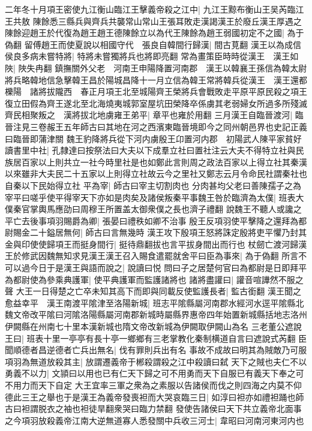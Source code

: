 二年冬十月項王密使九江衡山臨江王擊義帝殺之江中|{
	九江王黥布衡山王吴芮臨江王共敖}
陳餘悉三縣兵與齊兵共襲常山常山王張耳敗走漢謁漢王於廢丘漢王厚遇之陳餘迎趙王於代復為趙王趙王德陳餘立以為代王陳餘為趙王弱國初定不之國|{
	為于偽翻}
留傅趙王而使夏說以相國守代　張良自韓間行歸漢|{
	間古莧翻}
漢王以為成信侯良多病未嘗特將|{
	特將未嘗獨將兵也將即亮翻}
常為畫策臣時時從漢王　漢王如陜|{
	陜失冉翻}
鎮撫關外父老　河南王申陽降置河南郡　漢王以韓襄王孫信為韓太尉將兵略韓地信急擊韓王昌於陽城昌降十一月立信為韓王常將韓兵從漢王　漢王還都櫟陽　諸將拔隴西　春正月項王北至城陽齊王榮將兵會戰敗走平原平原民殺之項王復立田假為齊王遂北至北海燒夷城郭室屋坑田榮降卒係虜其老弱婦女所過多所殘滅齊民相聚叛之　漢將拔北地虜雍王弟平|{
	章平也雍於用翻}
三月漢王自臨晉渡河|{
	臨晉注見三卷赧王五年師古曰其地在河之西濱東臨晉境即今之同州朝邑界也史記正義曰臨晉即蒲津關}
魏王豹降將兵從下河内虜殷王卬置河内郡　初陽武人陳平家貧好讀書里中社|{
	孔隸達曰按祭法曰大夫以下成羣立社曰置社注云大夫不得特立社與民族居百家以上則共立一社今時里社是也如鄭此言則周之政法百家以上得立社其秦漢以來雖非大夫民二十五家以上則得立社故云今之里社又鄭志云月令命民社謂秦社也自秦以下民始得立社}
平為宰|{
	師古曰宰主切割肉也}
分肉甚均父老曰善陳孺子之為宰平曰嗟乎使平得宰天下亦如是肉矣及諸侯叛秦平事魏王咎於臨濟為太僕|{
	班表大僕秦官掌輿馬應劭曰周穆王所置盖太御衆僕之長也濟子禮翻}
說魏王不聽人或讒之平亡去後事項羽賜爵為卿|{
	張晏曰禮秩如卿不治事}
殷王反項羽使平擊降之還拜為都尉賜金二十鎰居無何|{
	師古曰言無幾時}
漢王攻下殷項王怒將誅定殷將吏平懼乃封其金與印使使歸項王而挺身間行|{
	挺待鼎翻拔也言平拔身間出而行也}
杖劒亡渡河歸漢王於修武因魏無知求見漢王漢王召入賜食遣罷就舍平曰臣為事來|{
	為于偽翻}
所言不可以過今日于是漢王與語而說之|{
	說讀曰悦}
問曰子之居楚何官曰為都尉是日即拜平為都尉使為參乘典護軍|{
	使平典護軍而監護諸將也}
諸將盡讙曰|{
	讙音喧譁然不服之聲}
大王一日得楚之亡卒未知其高下而即與同載反使監護長者|{
	監古銜翻}
漢王聞之愈益幸平　漢王南渡平隂津至洛陽新城|{
	班志平隂縣屬河南郡水經河水逕平隂縣北魏文帝改平隂曰河隂洛陽縣屬河南郡新城時屬縣界惠帝四年始置新城縣括地志洛州伊闕縣在州南七十里本漢新城也隋文帝改新城為伊闕取伊闕山為名}
三老董公遮說王曰|{
	班表十里一亭亭有長十亭一鄉鄉有三老掌教化秦制横道自言曰遮說式芮翻}
臣聞順德者昌逆德者亡兵出無名|{
	伐有罪則兵出有名}
事故不成故曰明其為賊敵乃可服項羽為無道放殺其主|{
	放謂遷義帝于郴殺謂殺之江中殺讀曰弑}
天下之賊也夫仁不以勇義不以力|{
	文頴曰以用也已有仁天下歸之可不用勇而天下自服已有義天下奉之可不用力而天下自定}
大王宜率三軍之衆為之素服以告諸侯而伐之則四海之内莫不仰德此三王之舉也于是漢王為義帝發喪袒而大哭哀臨三日|{
	如淳曰袒亦如禮袒踊也師古曰袒謂脱衣之袖也袒徒旱翻衆哭曰臨力禁翻}
發使告諸侯曰天下共立義帝北面事之今項羽放殺義帝江南大逆無道寡人悉發關中兵收三河士|{
	韋昭曰河南河東河内也}
